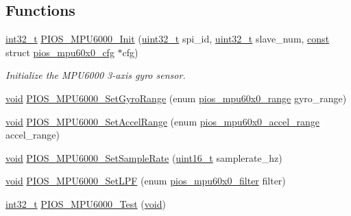 \subsection*{Functions}
\begin{DoxyCompactItemize}
\item 
\hyperlink{group___n_a_m_e_gafd12020da5a235dfcf0c3c748fb5baed}{int32\-\_\-t} \hyperlink{group___p_i_o_s___m_p_u6000_ga760dc0beda8303633fc946a9f9a2fc5f}{P\-I\-O\-S\-\_\-\-M\-P\-U6000\-\_\-\-Init} (\hyperlink{stdint_8h_a435d1572bf3f880d55459d9805097f62}{uint32\-\_\-t} spi\-\_\-id, \hyperlink{stdint_8h_a435d1572bf3f880d55459d9805097f62}{uint32\-\_\-t} slave\-\_\-num, \hyperlink{group___n_a_m_e_ga7ae6d0e43244213b34de2c2b9aa30da6}{const} struct \hyperlink{structpios__mpu60x0__cfg}{pios\-\_\-mpu60x0\-\_\-cfg} $\ast$cfg)
\begin{DoxyCompactList}\small\item\em Initialize the M\-P\-U6000 3-\/axis gyro sensor. \end{DoxyCompactList}\item 
\hyperlink{group___n_a_m_e_ga18028b8badbf1ea7e704ccac3c488e82}{void} \hyperlink{group___p_i_o_s___m_p_u6000_ga30de8c7bb6b3ad0bf178588f920fa2bd}{P\-I\-O\-S\-\_\-\-M\-P\-U6000\-\_\-\-Set\-Gyro\-Range} (enum \hyperlink{group___p_i_o_s___m_p_u60_x0_ga56700b0154a14cf67c9f8f44a86ad9c0}{pios\-\_\-mpu60x0\-\_\-range} gyro\-\_\-range)
\item 
\hyperlink{group___n_a_m_e_ga18028b8badbf1ea7e704ccac3c488e82}{void} \hyperlink{group___p_i_o_s___m_p_u6000_ga98c0cfbab60e9d6bd76c79d98f9b132b}{P\-I\-O\-S\-\_\-\-M\-P\-U6000\-\_\-\-Set\-Accel\-Range} (enum \hyperlink{group___p_i_o_s___m_p_u60_x0_ga8f297bddae3eb43bbf7b54abc6494992}{pios\-\_\-mpu60x0\-\_\-accel\-\_\-range} accel\-\_\-range)
\item 
\hyperlink{group___n_a_m_e_ga18028b8badbf1ea7e704ccac3c488e82}{void} \hyperlink{group___p_i_o_s___m_p_u6000_gafe485ba5675dc205bb3995d09bb5d9f1}{P\-I\-O\-S\-\_\-\-M\-P\-U6000\-\_\-\-Set\-Sample\-Rate} (\hyperlink{stdint_8h_a273cf69d639a59973b6019625df33e30}{uint16\-\_\-t} samplerate\-\_\-hz)
\item 
\hyperlink{group___n_a_m_e_ga18028b8badbf1ea7e704ccac3c488e82}{void} \hyperlink{group___p_i_o_s___m_p_u6000_ga2a5192c9f72585bd4511fde209df791b}{P\-I\-O\-S\-\_\-\-M\-P\-U6000\-\_\-\-Set\-L\-P\-F} (enum \hyperlink{group___p_i_o_s___m_p_u60_x0_gacce1988bc994f5ade6ac748c2bf0b924}{pios\-\_\-mpu60x0\-\_\-filter} filter)
\item 
\hyperlink{group___n_a_m_e_gafd12020da5a235dfcf0c3c748fb5baed}{int32\-\_\-t} \hyperlink{group___p_i_o_s___m_p_u6000_ga3bb050e34318f12ec520194f3c6d8bc4}{P\-I\-O\-S\-\_\-\-M\-P\-U6000\-\_\-\-Test} (\hyperlink{group___n_a_m_e_ga18028b8badbf1ea7e704ccac3c488e82}{void})

\end{DoxyCompactItemize}

